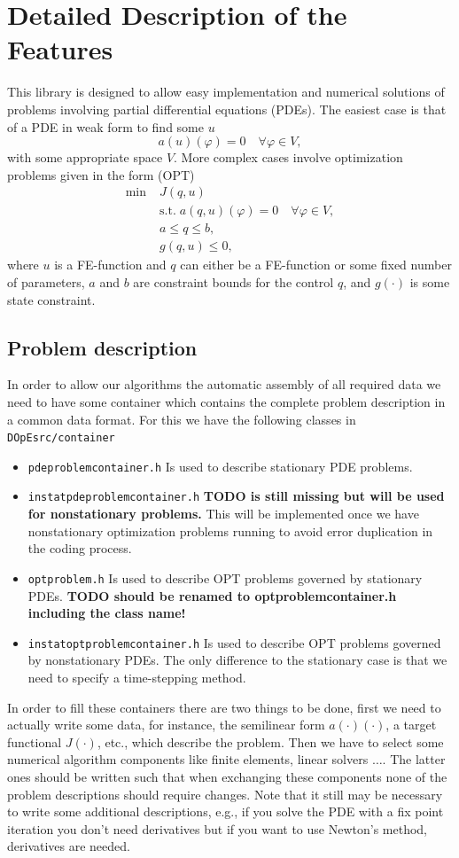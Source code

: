 \documentclass[prodmode,acmtoms]{acmsmall}
\numberwithin{equation}{section}
\renewcommand{\phi}{\varphi}
\begin{document}
\section{Detailed Description of the Features}
\label{detailed_description}
This library is designed to allow easy implementation and numerical solutions 
of problems involving partial differential equations (PDEs). The easiest case 
is that of a PDE in weak form to find some $u$
\[
a(u)(\phi) = 0 \quad \forall \phi \in V,
\]
with some appropriate space $V$.
More complex cases involve optimization problems given in the form (OPT)
\begin{align*}
\min\;&J(q,u) \\
  &\text{s.t.}\; a(q,u)(\phi) = 0 \quad \forall \phi\in V,\\
  &a \le q \le b,\\
  &g(q,u) \le 0,  
\end{align*}
where $u$ is a FE-function and $q$ can either be a FE-function or some 
fixed number of parameters, $a$ and $b$ are constraint bounds for the control $q$,
and $g(\cdot)$ is some state constraint.


\subsection{Problem description}
In order to allow our algorithms the automatic assembly of all required 
data we need to have some container which contains the complete problem 
description in a common data format. For this we have the following 
classes in \texttt{DOpEsrc/container}
\begin{itemize}
  \item \texttt{pdeproblemcontainer.h} Is used to describe  stationary PDE problems.
  \item \texttt{instatpdeproblemcontainer.h} {\bf TODO is still missing but will be used for nonstationary problems.} This will be implemented once we have nonstationary optimization problems running to avoid error duplication in the coding process.
  \item \texttt{optproblem.h} Is used to describe  OPT problems governed by 
    stationary PDEs. {\bf TODO should be renamed to optproblemcontainer.h including the class name!}
  \item \texttt{instatoptproblemcontainer.h} Is used to describe  OPT problems governed by nonstationary PDEs. The only difference to the stationary case is that we need to specify a time-stepping method.  
\end{itemize}
In order to fill these containers there are two things to be done,
first we need to actually write some data, for instance,
the semilinear form $a(\cdot)(\cdot)$, a target functional $J(\cdot)$, etc.,
which describe the problem. Then we have to select some numerical 
algorithm components like finite elements, linear solvers $\ldots$.
The latter ones should be written such that when exchanging these components
none of the problem descriptions should require changes. 
Note that it still may be necessary to write some additional descriptions, 
e.g., if you solve the PDE with a fix point iteration you don't need derivatives
but if you want to use Newton's method, derivatives are needed.
\end{document}
